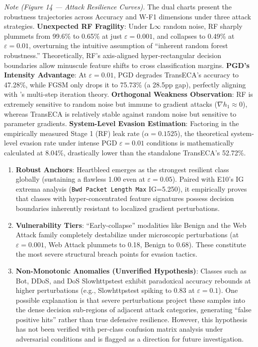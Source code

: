 \documentclass[sigconf]{acmart}
\begin{document}
\textit{Note (Figure 14 --- Attack Resilience Curves).} The dual charts present the robustness trajectories across Accuracy and W-F1 dimensions under three attack strategies. \textbf{Unexpected RF Fragility}: Under L$\infty$ random noise, RF sharply plummets from 99.6\% to 0.65\% at just $\varepsilon=0.001$, and collapses to 0.49\% at $\varepsilon=0.01$, overturning the intuitive assumption of ``inherent random forest robustness.'' Theoretically, RF's axis-aligned hyper-rectangular decision boundaries allow minuscule feature shifts to cross classification margins. \textbf{PGD's Intensity Advantage}: At $\varepsilon=0.01$, PGD degrades TransECA's accuracy to 47.28\%, while FGSM only drops it to 75.73\% (a 28.5pp gap), perfectly aligning with \cite{17}'s multi-step iteration theory. \textbf{Orthogonal Weakness Observation}: RF is extremely sensitive to random noise but immune to gradient attacks ($\nabla h_1 \approx 0$), whereas TransECA is relatively stable against random noise but sensitive to parameter gradients. \textbf{System-Level Evasion Estimation}: Factoring in the empirically measured Stage 1 (RF) leak rate ($\alpha=0.1525$), the theoretical system-level evasion rate under intense PGD $\varepsilon=0.01$ conditions is mathematically calculated at 8.04\%, drastically lower than the standalone TransECA's 52.72\%.

\begin{enumerate}
\item \textbf{Robust Anchors}: Heartbleed emerges as the strongest resilient class globally (sustaining a flawless 1.00 even at $\varepsilon=0.05$). Paired with E10's IG extrema analysis (\texttt{Bwd Packet Length Max} IG=5.250), it empirically proves that classes with hyper-concentrated feature signatures possess decision boundaries inherently resistant to localized gradient perturbations.
\item \textbf{Vulnerability Tiers}: ``Early-collapse'' modalities like Benign and the Web Attack family completely destabilize under microscopic perturbations (at $\varepsilon=0.001$, Web Attack plummets to 0.18, Benign to 0.68). These constitute the most severe structural breach points for evasion tactics.
\item \textbf{Non-Monotonic Anomalies (Unverified Hypothesis)}: Classes such as Bot, DDoS, and DoS Slowhttpstest exhibit paradoxical accuracy rebounds at higher perturbations (e.g., Slowhttpstest spiking to 0.83 at $\varepsilon=0.1$). One possible explanation is that severe perturbations project these samples into the dense decision sub-regions of adjacent attack categories, generating ``false positive hits'' rather than true defensive resilience. However, this hypothesis has not been verified with per-class confusion matrix analysis under adversarial conditions and is flagged as a direction for future investigation.
\end{enumerate}
\end{document}
